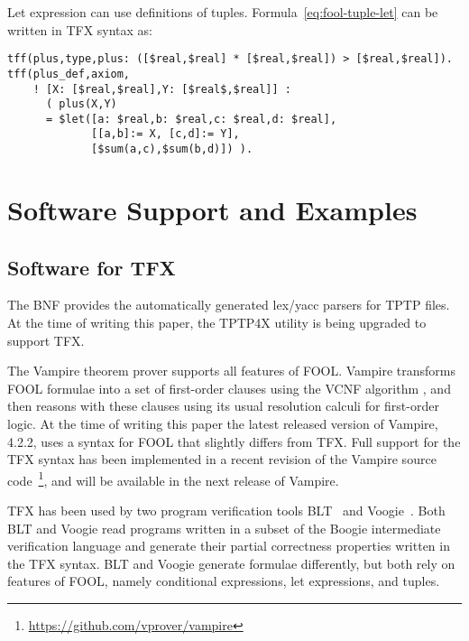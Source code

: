 \documentclass{easychair}
\begin{document}
Let expression can use definitions of tuples.
Formula~\ref{eq:fool-tuple-let} can be written in TFX syntax as:
\begin{verbatim}
tff(plus,type,plus: ([$real,$real] * [$real,$real]) > [$real,$real]).
tff(plus_def,axiom,
    ! [X: [$real,$real],Y: [$real$,$real]] :
      ( plus(X,Y) 
      = $let([a: $real,b: $real,c: $real,d: $real],
             [[a,b]:= X, [c,d]:= Y],
             [$sum(a,c),$sum(b,d)]) ).
\end{verbatim}

\section{Software Support and Examples}
\label{ImplementationExamples}

\subsection{Software for TFX}
\label{Software}

The BNF provides the automatically generated lex/yacc parsers for TPTP files.
At the time of writing this paper, the TPTP4X utility is being upgraded
to support TFX.

The Vampire theorem prover \cite{KV13} supports all features of FOOL. 
Vampire transforms FOOL formulae into a set of first-order clauses using the 
VCNF algorithm \cite{KK+16-GCAI}, and then reasons with these clauses using 
its usual resolution calculi for first-order logic. 
At the time of writing this paper the latest released version of Vampire,
4.2.2, uses a syntax for FOOL that slightly differs from TFX. 
Full support for the TFX syntax has been implemented in a recent revision of 
the Vampire source code~\footnote{%
\url{https://github.com/vprover/vampire}}, and will be available
in the next release of Vampire.

TFX has been used by two program verification tools BLT~\cite{CF17} and
Voogie~\cite{KKV18}. 
Both BLT and Voogie read programs written in a subset of the Boogie 
intermediate verification language and generate their partial correctness 
properties written in the TFX syntax. 
BLT and Voogie generate formulae differently, but both rely on features of 
FOOL, namely conditional expressions, let expressions, and tuples.

\end{document}
